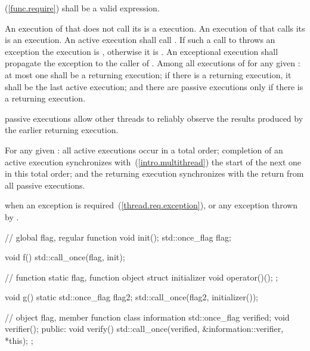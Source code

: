 \begin{itemdescr}
\pnum
\requires
{}
 \brk{}(\ref{func.require}) shall be
a valid expression.

\pnum
\effects An execution of  that does not call its  is a
 execution. An execution of  that calls its 
is an  execution. An active execution shall call
. If such a call to 
throws an exception the execution is , otherwise it is .
An exceptional execution shall propagate the exception to the caller of
. Among all executions of  for any given
: at most one shall be a returning execution; if there is a
returning execution, it shall be the last active execution; and there are
passive executions only if there is a returning execution. \begin{note} passive
executions allow other threads to reliably observe the results produced by the
earlier returning execution. \end{note}

\pnum
\sync For any given : all active executions occur in a total
order; completion of an active execution synchronizes with~(\ref{intro.multithread})
the start of the next one in this total order; and the returning execution
synchronizes with the return from all passive executions.

\pnum\throws {} when
an exception is required~(\ref{thread.req.exception}), or any exception thrown by .

\pnum
\begin{example}
\begin{codeblock}
// global flag, regular function
void init();
std::once_flag flag;

void f() {
  std::call_once(flag, init);
}

// function static flag, function object
struct initializer {
  void operator()();
};

void g() {
  static std::once_flag flag2;
  std::call_once(flag2, initializer());
}

// object flag, member function
class information {
  std::once_flag verified;
  void verifier();
public:
  void verify() { std::call_once(verified, &information::verifier, *this); }
};
\end{codeblock}
\end{example}
\end{itemdescr}


